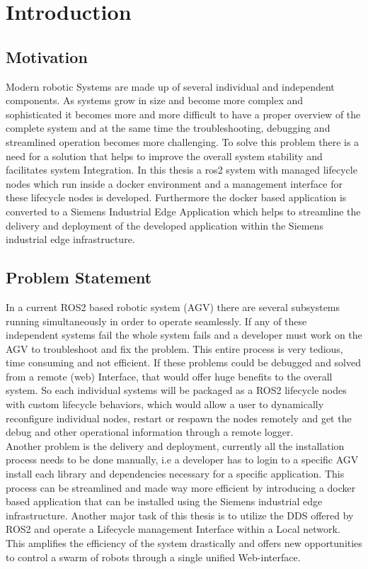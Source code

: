 \chapter{Introduction}
\label{Introduction}

	\section{Motivation}
	\label{Introduction:Motivation}
	Modern robotic Systems are made up of several individual and independent components. As systems grow in size and become more complex and sophisticated it becomes more and more difficult to have a proper overview of the complete system and at the same time the troubleshooting, debugging and streamlined operation becomes more challenging. To solve this problem there is a need for a solution that helps to improve the overall system stability and facilitates system Integration. In this thesis a ros2 system with managed lifecycle nodes which run inside a docker environment and a management interface for these lifecycle nodes is developed. Furthermore the docker based application is converted to a Siemens Industrial Edge Application which helps to streamline the delivery and deployment of the developed application within the Siemens industrial edge infrastructure.
	
	\section{Problem Statement}
	\label{Introduction:Problem Statement}
	In a current ROS2 based robotic system (AGV) there are several subsystems running simultaneously in order to operate seamlessly. If any of these independent systems fail the whole system fails and a developer must work on the AGV to troubleshoot and fix the problem. This entire process is very tedious, time consuming and not efficient. If these problems could be debugged and solved from a remote (web) Interface, that would offer huge benefits to the overall system. So each individual systems will be packaged as a ROS2 lifecycle nodes with custom lifecycle behaviors, which would allow a user to dynamically reconfigure individual nodes, restart or respawn the nodes remotely and get the debug and other operational information through a remote logger.\\

	Another problem is the delivery and deployment, currently all the installation process needs to be done manually, i.e a developer has to login to a specific AGV install each library and dependencies necessary for a specific application. This process can be streamlined and made way more efficient by introducing a docker based application that can be installed using the Siemens industrial edge infrastructure. Another major task of this thesis is to utilize the DDS offered by ROS2 and operate a Lifecycle management Interface within a Local network. This amplifies the efficiency of the system drastically and offers new opportunities to control a swarm of robots through a single unified Web-interface.
	
